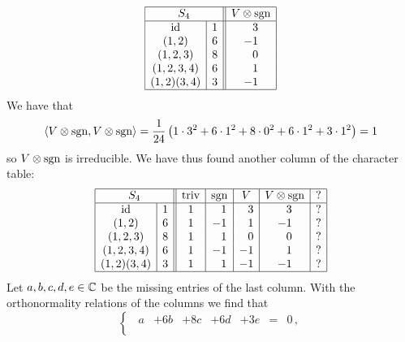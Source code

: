 \begin{example}
  \[
    \begin{array}{|c|c||c|}
      \hline
        \multicolumn{2}{|c||}{S_4}
      & V \tensor \sgn
      \\
      \hline
        \id
      & 1
      & \phantom{-}3
      \\
        (1,2)
      & 6
      & -1
      \\
        (1,2,3)
      & 8
      & \phantom{-}0
      \\
        (1,2,3,4)
      & 6
      & \phantom{-}1
      \\
        (1,2)(3,4)
      & 3
      & -1
      \\
      \hline
    \end{array}
  \]
  We have that
  \[
      \langle  V \mathbin{\otimes} \operatorname{sgn}, V \mathbin{\otimes} \operatorname{sgn}  \rangle
    = \frac{1}{24}
      \left(
          1 \cdot 3^2
        + 6 \cdot 1^2
        + 8 \cdot 0^2
        + 6 \cdot 1^2
        + 3 \cdot 1^2
      \right)
    = 1
  \]
  so $V \mathbin{\otimes} \operatorname{sgn}$ is irreducible.
  We have thus found another column of the character table:
  \[
    \begin{array}{|c|c||c|c|c|c|c|}
      \hline
        \multicolumn{2}{|c||}{S_4}
      & \triv
      & \sgn
      & V
      & V \tensor \sgn
      & ?
      \\
      \hline
        \id
      & 1
      &            1
      & \phantom{-}1
      & \phantom{-}3
      & \phantom{-}3
      &            ?
      \\
        (1,2)
      & 6
      &            1
      &           -1
      & \phantom{-}1
      &           -1
      &            ?
      \\
        (1,2,3)
      & 8
      &            1
      & \phantom{-}1
      & \phantom{-}0
      & \phantom{-}0
      &            ?
      \\
        (1,2,3,4)
      & 6
      &            1
      &           -1
      &           -1
      & \phantom{-}1
      &            ?
      \\
        (1,2)(3,4)
      & 3
      &            1
      & \phantom{-}1
      &           -1
      &           -1
      &            ?
      \\
      \hline
    \end{array}
  \]
  Let $a,b,c,d,e \in \mathbb{C}$ be the missing entries of the last column.
  With the orthonormality relations of the columns we find that
  \[
    \left\{
      \begin{array}{lllllcl}
        \phantom{3}a    & + 6b    & + 8c    & + 6d    & + 3e    &=& 0 \,, \\

\end{array}\]
\end{example}
